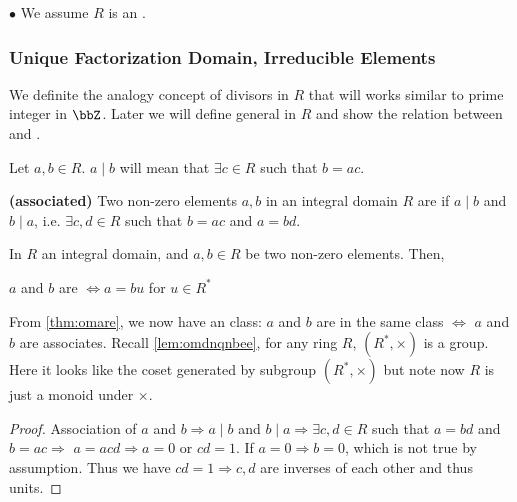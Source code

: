 \documentclass{article}
\newcommand{\bfs}[1]{\textbf{({#1}) }}
\begin{document}
$\bullet$ We assume $R$ is an .

\subsubsection{Unique Factorization Domain, Irreducible Elements}\label{sec:infddf}
We definite the analogy concept of  divisors  in $R$ that will works similar to prime integer in $\bbZ$. Later we will define general  in $R$ and show the relation between   and .



\begin{defa}
Let $a, b \in R$.  $a \mid b$ will mean that $\exists c \in R$ such that $b=a c$.
\end{defa}

\begin{defa}\bfs{associated}
Two non-zero elements $a, b$ in an integral domain $R$ are  if $a \mid b$ and $b \mid a$, i.e. $\exists c, d \in R$ such that $b=a c$ and $a=b d$.
\end{defa}
\begin{thma}\label{thm:omare}
 In $R$ an integral domain, and $a, b \in R$ be two non-zero elements. Then, 
 
 \centerline{$a$ and $b$ are  $\Longleftrightarrow a=b u$ for $u \in R^{*}$}
\end{thma}
\begin{rema}
\label{rem:ina}From \cref{thm:omare},
 we now have an  class:  $a$ and $b$ are in the same class $\Longleftrightarrow$ $a$ and $b$ are associates. Recall \cref{lem:omdnqnbee}, for any ring $R$, $\left(R^{*}, \times\right)$ is a group. Here it looks like the coset generated by subgroup $\left(R^{*}, \times\right)$ but note now $R$ is just a monoid under $\times$.
\end{rema}
\begin{proof}
Association of $a$ and $b \Rightarrow a \mid b$ and $b \mid a \Rightarrow \exists c, d \in R$ such that $a=b d$ and $b=a c \Rightarrow$ $a=a c d \Rightarrow a=0$ or $c d=1$. If $a=0 \Rightarrow b=0$, which is not true by assumption. Thus we have $c d=1 \Rightarrow c, d$ are inverses of each other and thus units.
\end{proof}
\end{document}
